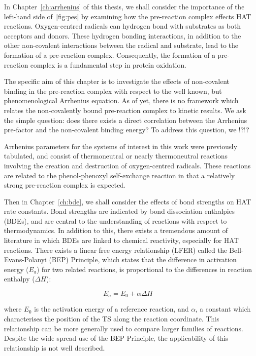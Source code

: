 In Chapter~\ref{ch:arrhenius} of this thesis, we shall consider the importance of the left-hand side of~\ref{fig:pes} by examining how the pre-reaction complex effects HAT reactions. Oxygen-centred radicals can hydrogen bond with substrates as both acceptors and donors.\cite{Johnson2009a} These hydrogen bonding interactions, in addition to the other non-covalent interactions between the radical and substrate, lead to the formation of a pre-reaction complex. Consequently, the formation of a pre-reaction complex is a fundamental step in protein oxidation.

The specific aim of this chapter is to investigate the effects of non-covalent binding in the pre-reaction complex with respect to the well known, but phenomenological Arrhenius equation. As of yet, there is no framework which relates the non-covalently bound pre-reaction complex to kinetic results. We ask the simple question: does there exists a direct correlation between the Arrhenius pre-factor and the non-covalent binding energy? To address this question, we !?!?

Arrhenius parameters for the systems of interest in this work were previously tabulated,\cite{DiLabio2005} and consist of thermoneutral or nearly thermoneutral reactions involving the creation and destruction of oxygen-centred radicals. These reactions are related to the phenol-phenoxyl self-exchange reaction in that a relatively strong pre-reaction complex is expected.


Then in Chapter~\ref{ch:bde}, we shall consider the effects of bond strengths on HAT rate constants. Bond strengths are indicated by bond dissociation enthalpies (BDEs), and are central to the understanding of reactions with respect to thermodynamics. In addition to this, there exists a tremendous amount of literature in which BDEs are linked to chemical reactivity, especially for HAT reactions.\cite{Kochi1973, Tedder1982, Wijtmans2003, Pratt2004, Mayer2004} There exists a linear free energy relationship (LFER) called the Bell-Evans-Polanyi (BEP) Principle,\cite{Bell1936,Evans1938} which states that the difference in activation energy ($E_a$) for two related reactions, is proportional to the differences in reaction enthalpy ($\Delta H$):

\begin{equation}
  E_a = E_0 + \alpha \Delta H
  \label{eq:bep}
\end{equation}

\noindent where $E_0$ is the activation energy of a reference reaction, and $\alpha$, a constant which characterises the position of the TS along the reaction coordinate. This relationship can be more generally used to compare larger families of reactions. Despite the wide spread use of the BEP Principle, the applicability of this relationship is not well described.


